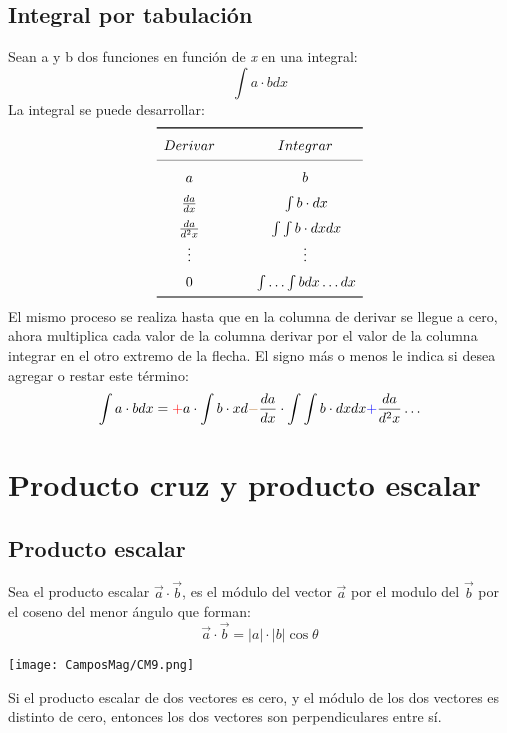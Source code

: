 \documentclass[
	12pt, %
	fleqn, %
	a4paper, %
	oneside, %
]{LegrandOrangeBook}
\begin{document}
\section{Integral por tabulación}
Sean a y b dos funciones en función de \textit{x} en una integral:
\begin{displaymath}
\int a\cdot b dx
\end{displaymath}
La integral se puede desarrollar:
\[
    \renewcommand{\arraystretch}{1.5}
    \begin{array}{c @{\hspace*{1.0cm}} c}\toprule
       Derivar & Integrar \\\cmidrule{1-2}
      a\tikzmark{Left 1} & \tikzmark{Right 1}b \\
      \frac{da}{dx} \tikzmark{Left 2} & \tikzmark{Right 2}\int b\cdot dx \\      
      \frac{da}{d^2x}  \tikzmark{Left 3} & \tikzmark{Right 3}\int\int b\cdot dx dx \\      
      \vdots  \tikzmark{Left 4} & \tikzmark{Right 4}\vdots \\
      0  \tikzmark{Left 5} & \tikzmark{Right 5}\int\ldots\int b dx\ldots dx \\
      \bottomrule
    \end{array}
\]
%
%
%
%
El mismo proceso se realiza hasta que en la columna de derivar se llegue a cero, ahora multiplica cada valor de la columna derivar por el valor de la columna integrar en el otro extremo de la flecha. El signo más o menos le indica si desea agregar o restar este término:
\begin{equation}
\label{art:integral pr tabulacion}
\int a\cdot b dx=\textcolor{red}+a\cdot\int b\cdot xd \textcolor{brown}{-}\frac{da}{dx}\cdot\int\int b\cdot dx dx\textcolor{blue}{+}\frac{da}{d^2x}\ldots
\end{equation}
\chapter{Producto cruz y producto escalar}
\section{Producto escalar}
Sea el producto escalar $\vec{a}\cdot\vec{b}$, es el módulo del vector $\vec{a}$ por el modulo del $\vec{b}$ por el coseno del menor ángulo que forman:
\begin{equation}
\vec{a}\cdot\vec{b}=|a|\cdot |b|\cos\theta
\end{equation}
\begin{center}
\texttt{[image: CamposMag/CM9.png]}
\end{center}
Si el producto escalar de dos vectores es cero, y el módulo de los dos vectores es distinto de cero, entonces los dos vectores son perpendiculares entre sí.
\end{document}
